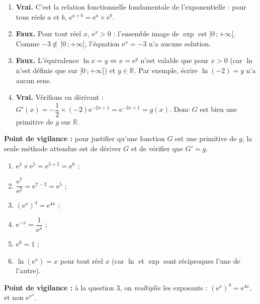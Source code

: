 \documentclass[11pt]{article}
\newcommand{\cle}[1]{{\popxbold\color{popdark}#1}}
\begin{document}
\begin{corrige}
\begin{enumerate}
\item \textbf{Vrai.} C'est la relation fonctionnelle fondamentale de l'exponentielle : pour tous réels $a$ et $b$, $\mathrm{e}^{a+b}=\mathrm{e}^{a}\times \mathrm{e}^{b}$.
\item \textbf{Faux.} Pour tout réel $x$, $\mathrm{e}^{x}>0$ : l'ensemble image de $\exp$ est $]0\,;+\infty[$. Comme $-3\notin\,]0\,;+\infty[$, l'équation $\mathrm{e}^{x}=-3$ n'a aucune solution.
\item \textbf{Faux.} L'équivalence $\ln x = y \iff x=\mathrm{e}^{y}$ n'est valable que pour $x>0$ (car $\ln$ n'est définie que sur $]0\,;+\infty[$) et $y\in\mathbb{R}$. Par exemple, écrire $\ln(-2)=y$ n'a aucun sens.
\item \textbf{Vrai.} Vérifions en dérivant : $G'(x)=-\dfrac{1}{2}\times(-2)\mathrm{e}^{-2x+1}=\mathrm{e}^{-2x+1}=g(x)$. Donc $G$ est bien une primitive de $g$ sur $\mathbb{R}$.
\end{enumerate}
\textbf{Point de vigilance :} pour justifier qu'une fonction $G$ est une primitive de $g$, la seule méthode attendue est de \cle{dériver} $G$ et de vérifier que $G'=g$.
\end{corrige}

\begin{corrige}
\begin{enumerate}
\item $\mathrm{e}^{3}\times\mathrm{e}^{5}=\mathrm{e}^{3+5}=\mathrm{e}^{8}$ ;
\item $\dfrac{\mathrm{e}^{7}}{\mathrm{e}^{2}}=\mathrm{e}^{7-2}=\mathrm{e}^{5}$ ;
\item $\left(\mathrm{e}^{x}\right)^{4}=\mathrm{e}^{4x}$ ;
\item $\mathrm{e}^{-x}=\dfrac{1}{\mathrm{e}^{x}}$ ;
\item $\mathrm{e}^{0}=1$ ;
\item $\ln\left(\mathrm{e}^{x}\right)=x$ pour tout réel $x$ (car $\ln$ et $\exp$ sont réciproques l'une de l'autre).
\end{enumerate}
\textbf{Point de vigilance :} à la question 3, on \emph{multiplie} les exposants : $(\mathrm{e}^{x})^{4}=\mathrm{e}^{4x}$, et non $\mathrm{e}^{x^{4}}$.
\end{corrige}
\end{document}
